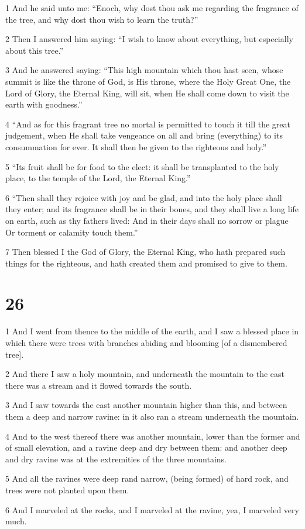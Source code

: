 \par 1 And he said unto me: “Enoch, why dost thou ask me regarding the fragrance of the tree, and why dost thou wish to learn the truth?”
\par 2 Then I answered him saying: “I wish to know about everything, but especially about this tree.”
\par 3 And he answered saying: “This high mountain which thou hast seen, whose summit is like the throne of God, is His throne, where the Holy Great One, the Lord of Glory, the Eternal King, will sit, when He shall come down to visit the earth with goodness.”
\par 4 “And as for this fragrant tree no mortal is permitted to touch it till the great judgement, when He shall take vengeance on all and bring (everything) to its consummation for ever. It shall then be given to the righteous and holy.”
\par 5 “Its fruit shall be for food to the elect: it shall be transplanted to the holy place, to the temple of the Lord, the Eternal King.”
\par 6 “Then shall they rejoice with joy and be glad, and into the holy place shall they enter; and its fragrance shall be in their bones, and they shall live a long life on earth, such as thy fathers lived: And in their days shall no sorrow or plague Or torment or calamity touch them.”
\par 7 Then blessed I the God of Glory, the Eternal King, who hath prepared such things for the righteous, and hath created them and promised to give to them.

\chapter{26}

\par 1 And I went from thence to the middle of the earth, and I saw a blessed place in which there were trees with branches abiding and blooming [of a dismembered tree].
\par 2 And there I saw a holy mountain, and underneath the mountain to the east there was a stream and it flowed towards the south.
\par 3 And I saw towards the east another mountain higher than this, and between them a deep and narrow ravine: in it also ran a stream underneath the mountain.
\par 4 And to the west thereof there was another mountain, lower than the former and of small elevation, and a ravine deep and dry between them: and another deep and dry ravine was at the extremities of the three mountains.
\par 5 And all the ravines were deep rand narrow, (being formed) of hard rock, and trees were not planted upon them.
\par 6 And I marveled at the rocks, and I marveled at the ravine, yea, I marveled very much.

